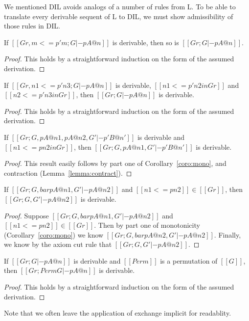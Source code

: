 We mentioned DIL avoids analogs of a number of rules from L.  To be
able to translate every derivable sequent of L to DIL, we must show
admissibility of those rules in DIL.
\begin{lemma}[Reflexivity]
  \label{lemma:reflexivity}
  If $[[Gr, m <=p' m ; G |- p A @ n]]$ is derivable, then so is $[[Gr ; G |- p A @ n]]$.
\end{lemma}
  \begin{proof}
    This holds by a straightforward induction on the form of the assumed derivation.
  \end{proof}

\begin{lemma}[Transitivity]
  \label{lemma:transitivity}
  If $[[Gr, n1 <=p' n3 ; G |- p A @ n]]$ is derivable, $[[n1 <=p' n2 in Gr]]$ and $[[n2 <=p' n3 in Gr]]$, 
  then $[[Gr ; G |- p A @ n]]$ is derivable.
\end{lemma}
  \begin{proof}
    This holds by a straightforward induction on the form of the assumed derivation.
  \end{proof}

\begin{lemma}[MonoL]
  \label{lemma:monol}
  If $[[Gr ; G , p A @ n1 , p A @ n2,G' |- p' B @ n']]$ is derivable and $[[n1 <=p n2 in Gr]]$, then
  $[[Gr ; G , p A @ n1,G' |- p' B @ n']]$ is derivable.
\end{lemma}
\begin{proof}
  This result easily follows by part one of Corollary~\ref{coro:mono}, and contraction (Lemma~\ref{lemma:contract}).
\end{proof}

\begin{lemma}[MonoR]
  \label{lemma:monor}
  If $[[Gr ; G, bar p A @ n1, G' |- p A @ n2]]$ and $[[n1 <= p n2]] \in [[Gr]]$, then 
  $[[Gr ; G, G' |- p A @ n2]]$ is derivable.
\end{lemma}
  \begin{proof}
    Suppose $[[Gr ; G, bar p A @ n1, G' |- p A @ n2]]$ and $[[n1 <= p n2]] \in [[Gr]]$.
    Then by part one of monotonicity (Corollary~\ref{coro:mono}) we know 
    $[[Gr ; G, bar p A @ n2, G' |- p A @ n2]]$.  Finally, we know by the 
    axiom cut rule that $[[Gr ; G, G' |- p A @ n2]]$.    
  \end{proof}

\begin{lemma}[Exchange]
  \label{lemma:exchange}
  If $[[Gr ; G |- p A @ n]]$ is derivable and $[[Perm]]$ is a permutation of $[[G]]$, then
  $[[Gr ; Perm G |- p A @ n]]$ is derivable.
\end{lemma}
  \begin{proof}
    This holds by a straightforward induction on the form of the assumed derivation.
  \end{proof}
Note that we often leave the application of exchange implicit for
readablity.

